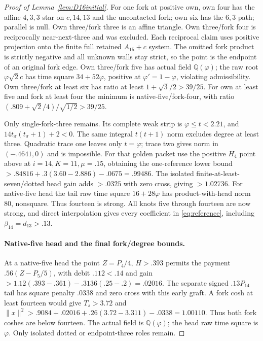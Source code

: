 \documentclass[11pt]{article}
\begin{document}
\begin{proof}[Proof of Lemma~\ref{lem:D16initial}]
For one fork at positive own, own four has the affine $4,3,3$
star on $c,14,13$ and the uncontacted fork; own six has the
$6,3$ path; parallel is null.
Own three/fork three is an affine triangle.
Own three/fork four is reciprocally near-next-three and was excluded.
Each reciprocal claim uses positive projection onto the finite
full retained $A_{15}+c$ system. The omitted fork product is
strictly negative and all unknown walls stay strict, so the point
is the endpoint of an original fork edge.
Own three/fork five has actual field $\mathbb Q(\varphi)$;
the raw root $\varphi\sqrt2c$ has time square $34+52\varphi$,
positive at $\varphi'=1-\varphi$, violating admissibility.
Own three/fork at least six has ratio at least
$1+\sqrt3/2>39/25$.
For own at least five and fork at least four the minimum is
native-five/fork-four, with ratio
$(.809+\sqrt2/4)/\sqrt{1/2}>39/25$.

Only single-fork-three remains. Its complete weak strip is
$\varphi\le t<2.21$, and
$14t_\sigma(t_\sigma+1)+2<0$.
The same integral $t(t+1)$ norm excludes degree at least three.
Quadratic trace one leaves only $t=\varphi$; trace two gives
norm in $(-.4641,0)$ and is impossible.
For that golden packet use the positive $H_4$ point above at
$i=14,K=11,\mu=.15$, obtaining the one-reference lower bound
$>.84816+.3(3.60-2.886)-.0675=.99486$.
The isolated finite-at-least-seven/dotted head gain adds
$>.0325$ with zero cross, giving $>1.02736$.
For native-five head the tail raw time square $16+28\varphi$
has product-with-head norm $80$, nonsquare.
Thus fourteen is strong. All knots five through fourteen are now
strong, and direct interpolation gives every coefficient in
\eqref{eq:reference}, including $\beta_{14}=d_{13}>.13$.

\paragraph{Native-five head and the final fork/degree bounds.}
At a native-five head the point $Z=P_4/4$, $H>.393$ permits
the payment $.56(Z-P_5/5)$, with debit $.112<.14$ and gain
$>1.12(.393-.361)-.3136(.25-.2)=.02016$.
The separate signed $.13P_{14}$ tail has square penalty $.0338$
and zero cross with this early graft. A fork cosh at least fourteen
would give $T_s>3.72$ and
$\|x\|^2>.9084+.02016+.26(3.72-3.311)-.0338=1.00110$.
Thus both fork coshes are below fourteen.
The actual field is $\mathbb Q(\varphi)$; the head raw time square
is $\varphi$. Only isolated dotted or endpoint-three roles remain.


\end{proof}
\end{document}
